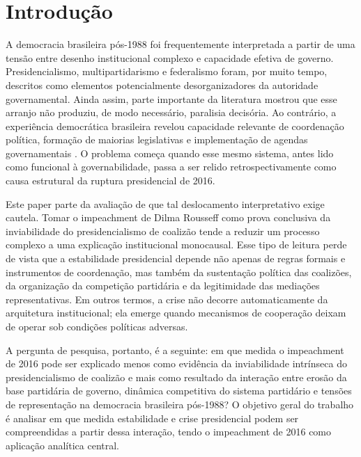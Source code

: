 \documentclass[12pt,a4paper]{article}
\begin{document}
\section{Introdução}
\label{sec:org908f214}
A democracia brasileira pós-1988 foi frequentemente interpretada a partir de uma tensão entre desenho institucional complexo e capacidade efetiva de governo. Presidencialismo, multipartidarismo e federalismo foram, por muito tempo, descritos como elementos potencialmente desorganizadores da autoridade governamental. Ainda assim, parte importante da literatura mostrou que esse arranjo não produziu, de modo necessário, paralisia decisória. Ao contrário, a experiência democrática brasileira revelou capacidade relevante de coordenação política, formação de maiorias legislativas e implementação de agendas governamentais \textcite{palermo2000_como_se} \textcite{limongi2017_a_crise}. O problema começa quando esse mesmo sistema, antes lido como funcional à governabilidade, passa a ser relido retrospectivamente como causa estrutural da ruptura presidencial de 2016.

Este paper parte da avaliação de que tal deslocamento interpretativo exige cautela. Tomar o impeachment de Dilma Rousseff como prova conclusiva da inviabilidade do presidencialismo de coalizão tende a reduzir um processo complexo a uma explicação institucional monocausal. Esse tipo de leitura perde de vista que a estabilidade presidencial depende não apenas de regras formais e instrumentos de coordenação, mas também da sustentação política das coalizões, da organização da competição partidária e da legitimidade das mediações representativas. Em outros termos, a crise não decorre automaticamente da arquitetura institucional; ela emerge quando mecanismos de cooperação deixam de operar sob condições políticas adversas.

A pergunta de pesquisa, portanto, é a seguinte: em que medida o impeachment de 2016 pode ser explicado menos como evidência da inviabilidade intrínseca do presidencialismo de coalizão e mais como resultado da interação entre erosão da base partidária de governo, dinâmica competitiva do sistema partidário e tensões de representação na democracia brasileira pós-1988? O objetivo geral do trabalho é analisar em que medida estabilidade e crise presidencial podem ser compreendidas a partir dessa interação, tendo o impeachment de 2016 como aplicação analítica central.
\end{document}
